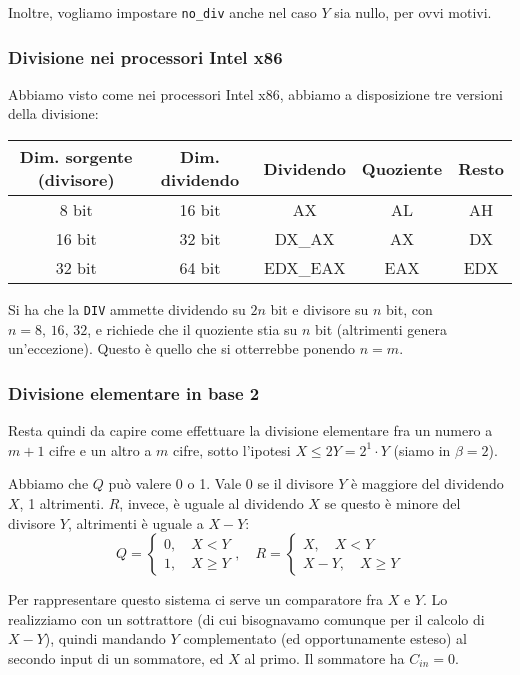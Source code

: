 \documentclass[a4paper,11pt]{article}
\begin{document}
Inoltre, vogliamo impostare \lstinline|no_div| anche nel caso $Y$ sia nullo, per ovvi motivi.

\subsubsection{Divisione nei processori Intel x86}
Abbiamo visto come nei processori Intel x86, abbiamo a disposizione tre versioni della divisione:

\begin{table}[h!]
	\center {}
	\begin{tabular} { c | c | c | c | c }
		\bfseries Dim. sorgente (divisore) & \bfseries Dim. dividendo & \bfseries Dividendo & \bfseries Quoziente & \bfseries Resto \\ 
		\hline 
		8 bit & 16 bit & AX & AL & AH \\ 
		16 bit & 32 bit & DX\_AX & AX & DX \\ 
		32 bit & 64 bit & EDX\_EAX & EAX & EDX
	\end{tabular}
\end{table}

Si ha che la \lstinline|DIV| ammette dividendo su $2n$ bit e divisore su $n$ bit, con $n = 8, \, 16, \, 32$, e richiede che il quoziente stia su $n$ bit (altrimenti genera un'eccezione).
Questo è quello che si otterrebbe ponendo $n = m$.

\subsubsection{Divisione elementare in base 2}
Resta quindi da capire come effettuare la divisione elementare fra un numero a $m+1$ cifre e un altro a $m$ cifre, sotto l'ipotesi $X \leq 2Y = 2^1 \cdot Y$ (siamo in $\beta=2$).

Abbiamo che $Q$ può valere 0 o 1. Vale 0 se il divisore $Y$ è maggiore del dividendo $X$, 1 altrimenti.
$R$, invece, è uguale al dividendo $X$ se questo è minore del divisore $Y$, altrimenti è uguale a $X - Y$:
$$
Q=
\begin{cases}
	0, \quad X < Y \\ 
	1, \quad X \geq Y
\end{cases}, \quad 
R =
\begin{cases}
	X, \quad X < Y \\ 
	X-Y, \quad X \geq Y
\end{cases}
$$

Per rappresentare questo sistema ci serve un comparatore fra $X$ e $Y$. 
Lo realizziamo con un sottrattore (di cui bisognavamo comunque per il calcolo di $X-Y$), quindi mandando $Y$ complementato (ed opportunamente esteso) al secondo input di un sommatore, ed $X$ al primo. 
Il sommatore ha $C_{in} = 0$.
\end{document}
